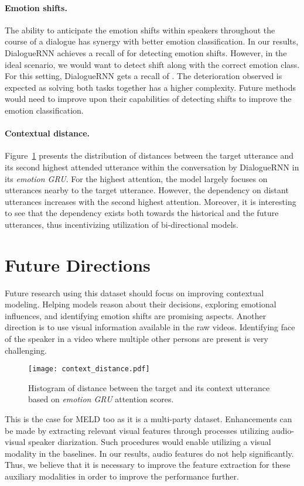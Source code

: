 \documentclass[11pt,a4paper]{article}
\begin{document}
\paragraph{Emotion shifts.} The ability to anticipate the emotion shifts within speakers throughout the course of a dialogue has synergy with better emotion classification. In our results, DialogueRNN achieves a recall of  for detecting emotion shifts. However, in the ideal scenario, we would want to detect shift along with the correct emotion class. For this setting, DialogueRNN gets a recall of . The deterioration observed is expected as solving both tasks together has a higher complexity. Future methods would need to improve upon their capabilities of detecting shifts to improve the emotion classification.


\paragraph{Contextual distance.}
Figure~\ref{fig:context_dist} presents the distribution of distances between the target utterance and its second highest attended utterance within the conversation by DialogueRNN in its \textit{emotion GRU}. For the highest attention, the model largely focuses on utterances nearby to the target utterance. However, the dependency on distant utterances increases with the second highest attention. Moreover, it is interesting to see that the dependency exists both towards the historical and the future utterances, thus incentivizing utilization of bi-directional models.
\section{Future Directions}
\label{sec:future}

Future research using this dataset should focus on improving contextual modeling. Helping models reason about their decisions, exploring emotional influences, and identifying emotion shifts are  promising aspects.
Another direction is to use visual information available in the raw videos. Identifying face of the speaker in a video where multiple other persons are present is very challenging. 
\begin{figure}[htbp!] 
 	\centering 
	\texttt{[image: context\_distance.pdf]}
	\caption[]{Histogram of  distance between the target and its context utterance based on \textit{emotion GRU} attention scores.}
	\label{fig:context_dist}
\end{figure}
This is the case for MELD too as it is a multi-party dataset. Enhancements can be made by extracting relevant visual features through processes utilizing audio-visual speaker diarization. Such procedures would enable utilizing a visual modality in the baselines. In our results, audio features do not help significantly. Thus, we believe that it is necessary to improve the feature extraction for these auxiliary modalities in order to improve the performance further.
\end{document}
